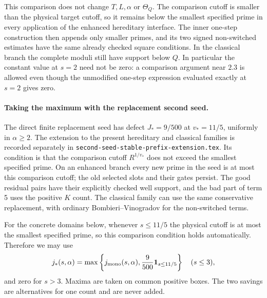 \documentclass[11pt]{article}
\begin{document}
This comparison does not change $T,L,\alpha$ or $\Theta_Q$. The
comparison cutoff is smaller than the physical target cutoff, so
it remains below the smallest specified prime in every application
of the enhanced hereditary interface. The inner one-step construction
then appends only smaller primes, and its two signed non-switched
estimates have the same already checked square conditions. In the
classical branch the complete moduli still have support below $Q$.
In particular the constant value at $s=2$ need not be zero: a
comparison argument near $2.3$ is allowed even though the unmodified
one-step expression evaluated exactly at $s=2$ gives zero.

\paragraph{Taking the maximum with the replacement second seed.}
The direct finite replacement seed has defect $J_*=9/500$ at
$v_*=11/5$, uniformly in $\alpha\ge2$.
The extension to the present hereditary and classical families is
recorded separately in
\texttt{second-seed-stable-prefix-extension.tex}. Its condition is
that the comparison cutoff $R^{1/v_*}$ does not exceed the smallest
specified prime. On an enhanced branch every new prime in the seed
is at most this comparison cutoff; the old selected slots and their
gates persist. The good residual pairs have their explicitly checked
well support, and the bad part of term 5 uses the positive $K$ count.
The classical family can use the same conservative replacement,
with ordinary Bombieri--Vinogradov for the non-switched terms.

For the concrete domains below, whenever $s\le11/5$ the physical
cutoff is at most the smallest specified prime, so this comparison
condition holds automatically. Therefore we may use
\begin{equation}\label{eq:monotone-and-second-seed}
 j_*(s,\alpha)=\max\left\{j_{\rm mono}(s,\alpha),
                   \frac9{500}\mathbf1_{s\le11/5}\right\}
 \quad(s\le3),
\end{equation}
and zero for $s>3$. Maxima are taken on common positive boxes.
The two savings are alternatives for one count and are never added.
\end{document}
